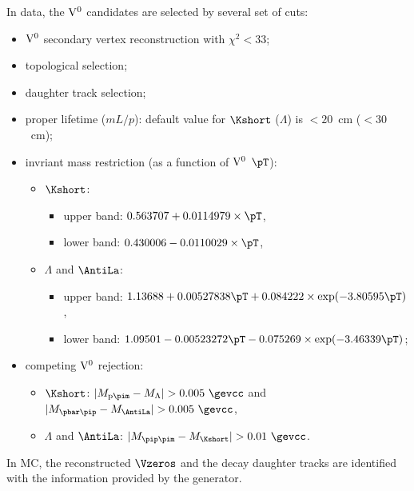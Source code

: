 In data, the ${\rm V}^{0}$ candidates are selected by several set of cuts:
\begin{itemize}
\item ${\rm V}^{0}$ secondary vertex reconstruction with $\chi^{2}<33$;
\item topological selection;
\item daughter track selection;
\item proper lifetime ($mL/p$):
      default value for $\Kshort$ ($\Lambda$) is $<20$~cm ($<30$~cm);
\item invriant mass restriction (as a function of ${\rm V}^{0}$ $\pT$):
      \begin{itemize}
      \item $\Kshort$:
            \begin{itemize}
            \item upper band: $0.563707+0.0114979\times\pT$,
            \item lower band: $0.430006-0.0110029\times\pT$,
            \end{itemize}
      \item $\Lambda$ and $\AntiLa$:
            \begin{itemize}
            \item upper band:
                  $1.13688+0.00527838\pT+0.084222\times\exp(-3.80595\pT)$,
            \item lower band:
                  $1.09501-0.00523272\pT-0.075269\times\exp(-3.46339\pT)$;
            \end{itemize}
      \end{itemize}
\item competing ${\rm V}^{0}$ rejection:
      \begin{itemize}
      \item $\Kshort$: $|M_{{\rm p}\pim}-M_{\Lambda}|>0.005~\gevcc$ and
                       $|M_{\pbar\pip}-M_{\AntiLa}|>0.005~\gevcc$,
      \item $\Lambda$ and $\AntiLa$: $|M_{\pip\pim}-M_{\Kshort}|>0.01~\gevcc$.
      \end{itemize}
\end{itemize}

In MC, the reconstructed $\Vzeros$ and the decay daughter tracks are identified with the information provided by the generator.

